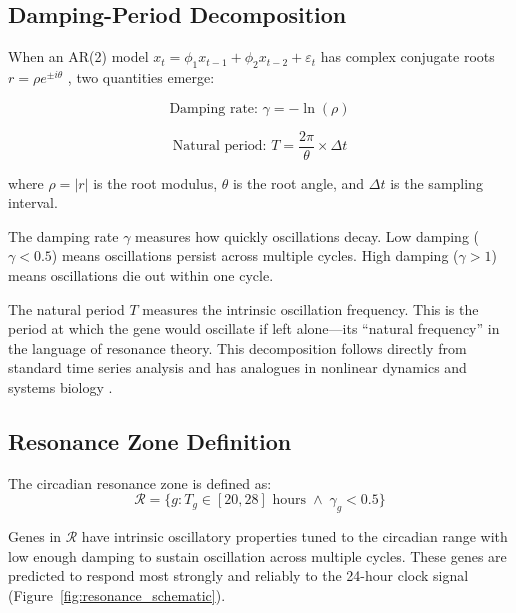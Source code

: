 \documentclass[11pt,letterpaper]{article}
\begin{document}
\subsection{Damping-Period Decomposition}

When an AR(2) model $x_t = \phi_1 x_{t-1} + \phi_2 x_{t-2} + \varepsilon_t$ has complex conjugate roots $r = \rho e^{\pm i\theta}$ \citep{hamilton1994time, box2015time}, two quantities emerge:

\begin{equation}
\text{Damping rate: } \gamma = -\ln(\rho)
\end{equation}

\begin{equation}
\text{Natural period: } T = \frac{2\pi}{\theta} \times \Delta t
\end{equation}

where $\rho = |r|$ is the root modulus, $\theta$ is the root angle, and $\Delta t$ is the sampling interval.

The damping rate $\gamma$ measures how quickly oscillations decay. Low damping ($\gamma < 0.5$) means oscillations persist across multiple cycles. High damping ($\gamma > 1$) means oscillations die out within one cycle.

The natural period $T$ measures the intrinsic oscillation frequency. This is the period at which the gene would oscillate if left alone---its ``natural frequency'' in the language of resonance theory. This decomposition follows directly from standard time series analysis \citep{hamilton1994time} and has analogues in nonlinear dynamics \citep{strogatz2001nonlinear} and systems biology \citep{alon2006introduction}.

\subsection{Resonance Zone Definition}

The circadian resonance zone is defined as:
\begin{equation}
\mathcal{R} = \{g : T_g \in [20, 28] \text{ hours} \;\wedge\; \gamma_g < 0.5\}
\end{equation}

Genes in $\mathcal{R}$ have intrinsic oscillatory properties tuned to the circadian range with low enough damping to sustain oscillation across multiple cycles. These genes are predicted to respond most strongly and reliably to the 24-hour clock signal (Figure~\ref{fig:resonance_schematic}).
\end{document}
